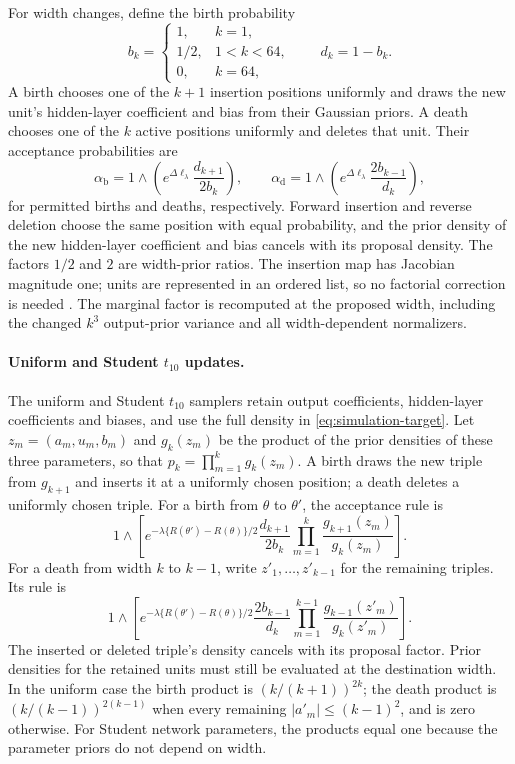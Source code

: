 \documentclass[11pt,a4paper]{article}
\theoremstyle{remark}
\newcommand{\abs}[1]{\lvert#1\rvert}
\begin{document}
For width changes, define the birth probability
\[
b_k=\begin{cases}
1,&k=1,\\
1/2,&1<k<64,\\
0,&k=64,
\end{cases}
\qquad d_k=1-b_k.
\]
A birth chooses one of the $k+1$ insertion positions uniformly
and draws the new unit's hidden-layer coefficient and bias from their Gaussian priors.
A death chooses one of the $k$ active positions uniformly and
deletes that unit. Their acceptance probabilities are
\begin{equation}\label{eq:simulation-gaussian-dimension}
\alpha_{\mathrm b}=1\wedge
\left(e^{\Delta\ell_\lambda}\frac{d_{k+1}}{2b_k}\right),
\qquad
\alpha_{\mathrm d}=1\wedge
\left(e^{\Delta\ell_\lambda}\frac{2b_{k-1}}{d_k}\right),
\end{equation}
for permitted births and deaths, respectively.
Forward insertion and reverse deletion choose the same position
with equal probability, and the prior density of the new hidden-layer coefficient and bias cancels
with its proposal density. The factors $1/2$ and $2$ are width-prior
ratios. The insertion map has Jacobian magnitude one; units are
represented in an ordered list, so no factorial correction is
needed \citep{green1995}. The marginal factor is recomputed at
the proposed width, including the changed $k^3$ output-prior
variance and all width-dependent normalizers.

\paragraph{Uniform and Student $t_{10}$ updates.}
The uniform and Student $t_{10}$ samplers retain output coefficients,
hidden-layer coefficients and biases, and use the full density in
\eqref{eq:simulation-target}. Let $z_m=(a_m,u_m,b_m)$ and
$g_k(z_m)$ be the product of the prior densities of these three parameters,
so that $p_k=\prod_{m=1}^k g_k(z_m)$.
A birth draws the new triple from $g_{k+1}$ and inserts it at a
uniformly chosen position; a death deletes a uniformly chosen
triple. For a birth from $\theta$ to $\theta'$, the acceptance rule is
\begin{equation}\label{eq:simulation-direct-birth}
1\wedge\left[
e^{-\lambda\{R(\theta')-R(\theta)\}/2}
\frac{d_{k+1}}{2b_k}
\prod_{m=1}^k\frac{g_{k+1}(z_m)}{g_k(z_m)}
\right].
\end{equation}
For a death from width $k$ to $k-1$, write
$z'_1,\ldots,z'_{k-1}$ for the remaining triples. Its rule is
\[
1\wedge\left[
e^{-\lambda\{R(\theta')-R(\theta)\}/2}
\frac{2b_{k-1}}{d_k}
\prod_{m=1}^{k-1}\frac{g_{k-1}(z'_m)}{g_k(z'_m)}
\right].
\]
The inserted or deleted triple's density cancels with its proposal
factor. Prior densities for the retained units must still be evaluated at
the destination width. In the uniform case the birth product is
$(k/(k+1))^{2k}$; the death product is
$(k/(k-1))^{2(k-1)}$ when every remaining
$\abs{a'_m}\leq(k-1)^2$, and is zero otherwise. For Student network parameters,
the products equal one because the parameter priors do not depend
on width.
\end{document}
